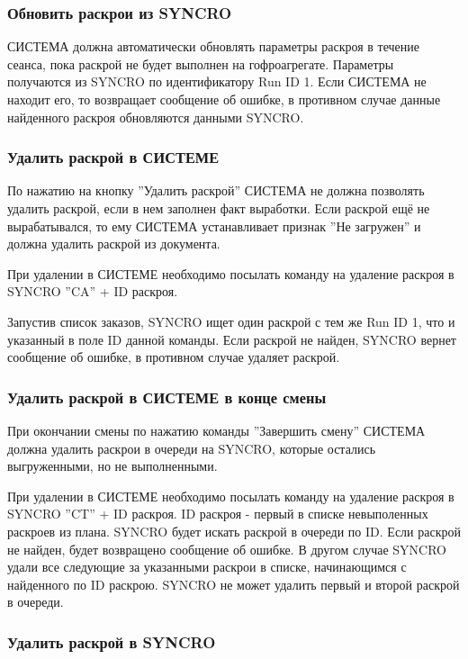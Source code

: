 \subsubsection{Обновить раскрои из SYNCRO}

СИСТЕМА должна автоматически обновлять параметры раскроя в течение сеанса, пока раскрой не будет выполнен на гофроагрегате.
Параметры получаются из SYNCRO по идентификатору Run ID 1. Если СИСТЕМА не находит его, то возвращает сообщение об ошибке, в противном случае данные найденного раскроя обновляются данными SYNCRO.

\subsubsection{Удалить раскрой в СИСТЕМЕ}

По нажатию на кнопку ''Удалить раскрой'' СИСТЕМА не должна позволять удалить раскрой, если в нем заполнен факт выработки. Если раскрой ещё не вырабатывался, то ему СИСТЕМА устанавливает признак ''Не загружен'' и должна удалить раскрой из документа. 

При удалении в СИСТЕМЕ необходимо посылать команду на удаление раскроя в SYNCRO 
''CA'' + ID раскроя.

Запустив список заказов, SYNCRO ищет один раскрой с тем же Run ID 1, что и указанный в поле ID данной команды. Если раскрой не найден, SYNCRO вернет сообщение об ошибке, в противном случае удаляет раскрой.

\subsubsection{Удалить раскрой в СИСТЕМЕ в конце смены}

При окончании смены по нажатию команды ''Завершить смену'' СИСТЕМА должна удалить раскрои в очереди на SYNCRO, которые остались выгруженными, но не выполненными.

При удалении в СИСТЕМЕ необходимо посылать команду на удаление раскроя в SYNCRO 
''CT'' + ID раскроя.
ID раскроя - первый в списке невыполенных раскроев из плана.
SYNCRO будет искать раскрой в очереди по ID. Если раскрой не найден, будет возвращено сообщение об ошибке. В другом случае SYNCRO удали все следующие за указанными раскрои в списке, начинающимся с найденного по ID раскрою.
SYNCRO не может удалить первый и второй раскрой в очереди.


\subsubsection{Удалить раскрой в SYNCRO}

